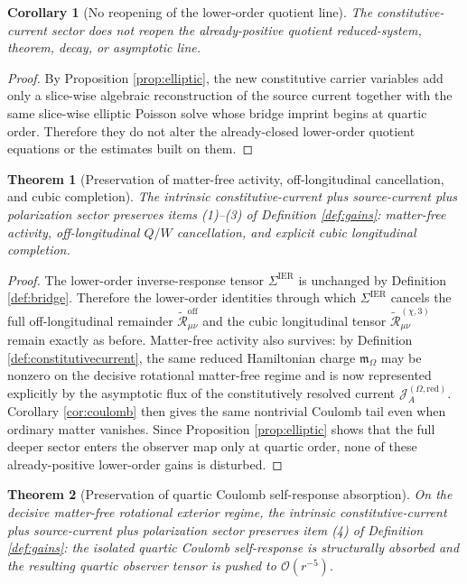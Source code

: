 \documentclass[11pt]{article}
\newcommand{\SourceCurrentRed}{\mathcal J^{(\Omega,\mathrm{red})}}
\newcommand{\HamChargeOmega}{\mathfrak m_\Omega}
\newcommand{\SigmaIER}{\Sigma^{\mathrm{IER}}}
\newcommand{\ReOff}{\widetilde{\mathcal R}_{\mu\nu}^{\mathrm{off}}}
\newcommand{\ReLongThree}{\widetilde{\mathcal R}_{\mu\nu}^{(\chi,3)}}
\newtheorem{corollary}{Corollary}
\newtheorem{theorem}{Theorem}
\begin{document}
\begin{corollary}[No reopening of the lower-order quotient line]
\label{cor:nopde}
The constitutive-current sector does not reopen the already-positive quotient reduced-system, theorem, decay, or asymptotic line.
\end{corollary}

\begin{proof}
By Proposition \ref{prop:elliptic}, the new constitutive carrier variables add only a slice-wise algebraic reconstruction of the source current together with the same slice-wise elliptic Poisson solve whose bridge imprint begins at quartic order. Therefore they do not alter the already-closed lower-order quotient equations or the estimates built on them.
\end{proof}

\begin{theorem}[Preservation of matter-free activity, off-longitudinal cancellation, and cubic completion]
\label{thm:firstthree}
The intrinsic constitutive-current plus source-current plus polarization sector preserves items (1)--(3) of Definition \ref{def:gains}: matter-free activity, off-longitudinal \(Q/W\) cancellation, and explicit cubic longitudinal completion.
\end{theorem}

\begin{proof}
The lower-order inverse-response tensor \(\SigmaIER\) is unchanged by Definition \ref{def:bridge}. Therefore the lower-order identities through which \(\SigmaIER\) cancels the full off-longitudinal remainder \(\ReOff\) and the cubic longitudinal tensor \(\ReLongThree\) remain exactly as before. Matter-free activity also survives: by Definition \ref{def:constitutivecurrent}, the same reduced Hamiltonian charge \(\HamChargeOmega\) may be nonzero on the decisive rotational matter-free regime and is now represented explicitly by the asymptotic flux of the constitutively resolved current \(\SourceCurrentRed_A\). Corollary \ref{cor:coulomb} then gives the same nontrivial Coulomb tail even when ordinary matter vanishes. Since Proposition \ref{prop:elliptic} shows that the full deeper sector enters the observer map only at quartic order, none of these already-positive lower-order gains is disturbed.
\end{proof}

\begin{theorem}[Preservation of quartic Coulomb self-response absorption]
\label{thm:quartic}
On the decisive matter-free rotational exterior regime, the intrinsic constitutive-current plus source-current plus polarization sector preserves item (4) of Definition \ref{def:gains}: the isolated quartic Coulomb self-response is structurally absorbed and the resulting quartic observer tensor is pushed to \(\mathcal O(r^{-5})\).
\end{theorem}
\end{document}
